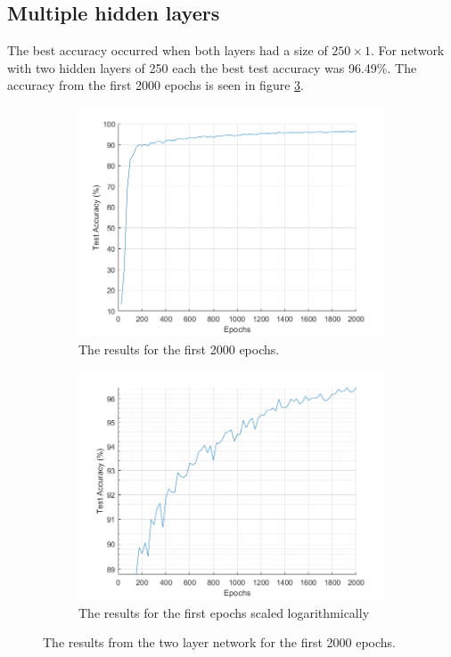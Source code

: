 \documentclass[12pt]{article}
\begin{document}
	\subsection{Multiple hidden layers}
	The best accuracy occurred when both layers had a size of $250\times1$. For network with two hidden layers of 250 each the best test accuracy was 96.49\%. The accuracy from the first 2000 epochs is seen in figure \ref{fig:250_all_l2}. 
		\begin{figure}
		\centering
		\begin{subfigure}{.5\textwidth}
			\centering
			\includegraphics[width=\linewidth]{250_results_l2}
			\caption{The results for the first 2000 epochs.}
			\label{fig:250results_l2}
		\end{subfigure}%
		\begin{subfigure}{.5\textwidth}
			\centering
			\includegraphics[width=\linewidth]{250_results_log_l2}
			\caption{The results for the first epochs scaled logarithmically}
			\label{fig:250resultslog_l2}
		\end{subfigure}
		\caption{The results from the two layer network for the first 2000 epochs.}
		\label{fig:250_all_l2}
	\end{figure}
\end{document}
